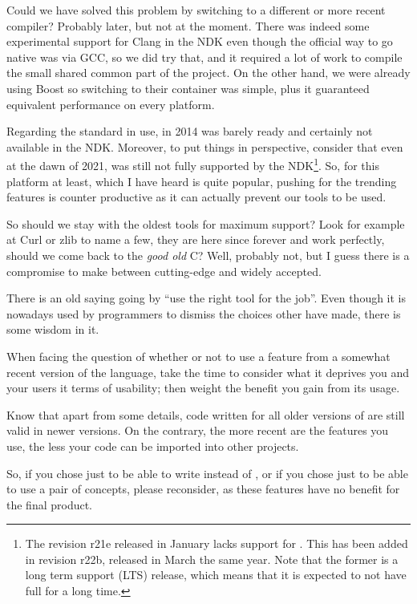 \bigskip

Could we have solved this problem by switching to a different or more
recent compiler? Probably later, but not at the moment. There was
indeed some experimental support for Clang in the NDK even though the
official way to go native was via GCC, so we did try that, and it
required a lot of work to compile the small shared common part of the
project. On the other hand, we were already using Boost so switching
to their container was simple, plus it guaranteed equivalent
performance on every platform.

Regarding the standard in use, in 2014  was barely ready and
certainly not available in the NDK. Moreover, to put things in
perspective, consider that even at the dawn of 2021,  was still
not fully supported by the NDK\footnote{The revision r21e released in
  January lacks support for . This has been
  added in revision r22b, released in March the same year. Note that
  the former is a long term support (LTS) release, which means that it
  is expected to not have full  for a long time.}. So, for this
platform at least, which I have heard is quite popular, pushing for
the trending features is counter productive as it can actually prevent
our tools to be used.

So should we stay with the oldest tools for maximum support? Look for
example at Curl or zlib to name a few, they are here since forever and
work perfectly, should we come back to the \emph{good old} C? Well,
probably not, but I guess there is a compromise to make between
cutting-edge and widely accepted.

\begin{guideline}
  There is an old saying going by ``use the right tool for the
  job''. Even though it is nowadays used by programmers to dismiss the choices
  other have made, there is some wisdom in it.

  When facing the question of whether or not to use a feature from a
  somewhat recent version of the language, take the time to consider
  what it deprives you and your users it terms of usability; then
  weight the benefit you gain from its usage.

  Know that apart from some details, code written for all older
  versions of \cpp{} are still valid in newer versions. On the
  contrary, the more recent are the features you use, the less your
  code can be imported into other projects.

  So, if you chose  just to be able to write  instead of , or if you chose 
  just to be able to use a pair of concepts, please reconsider, as
  these features have no benefit for the final product.
\end{guideline}
